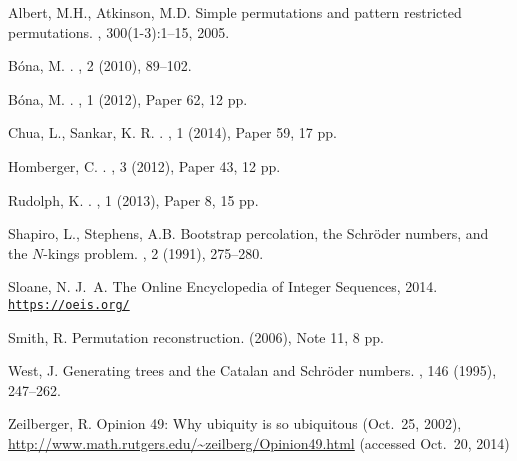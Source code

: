 \documentclass[10pt]{article}
\theoremstyle{definition}
\numberwithin{equation}{section}
\numberwithin{figure}{section}
\begin{document}
\begin{thebibliography}{1}

{\sc Albert, M.H., Atkinson, M.D.}
\newblock Simple permutations and pattern restricted permutations.
, 300(1-3):1--15, 2005.


{\sc B\'{o}na, M.}
.
, 2 (2010), 89--102.

{\sc B\'{o}na, M.}
.
, 1 (2012), Paper 62, 12 pp.

{\sc Chua, L., Sankar, K. R.}
.
, 1 (2014), Paper 59, 17 pp.

{\sc Homberger, C.}
.
, 3 (2012), Paper 43, 12 pp.

{\sc Rudolph, K.}
.
, 1 (2013), Paper 8, 15 pp.

{\sc Shapiro, L., Stephens, A.B.}
\newblock Bootstrap percolation, the {S}chr{\"o}der numbers, and the $N$-kings problem.
, 2 (1991), 275--280.

{\sc Sloane, N. J.~A.}
\newblock The {O}nline {E}ncyclopedia of {I}nteger {S}equences, 2014.
\newblock \href{https://oeis.org/}{\texttt{https://oeis.org/}}


{\sc Smith, R.}
\newblock Permutation reconstruction.
 (2006), Note 11, 8 pp.


{\sc West, J.}
\newblock Generating trees and the {C}atalan and {S}chr\"oder numbers.
, 146 (1995), 247--262.

{\sc Zeilberger, R.}
\newblock Opinion 49: Why ubiquity is so ubiquitous
\newblock (Oct.~25, 2002),
\newblock \url{http://www.math.rutgers.edu/~zeilberg/Opinion49.html} 
\newblock (accessed Oct.~20, 2014)

\end{thebibliography}
  
\end{document}
